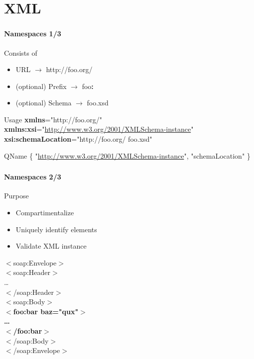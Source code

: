 \documentclass[handout]{beamer}
\begin{document}
\section{XML}
\begin{frame}
	\frametitle{\insertsection}
	\framesubtitle{Namespaces 1/3}
	\begin{block}{Consists of}
		\begin{itemize}
			\item URL $\rightarrow$ http://foo.org/
			\item (optional) Prefix $\rightarrow$ foo\textbf{:}
			\item (optional) Schema $\rightarrow$ foo.xsd
		\end{itemize}
	\end{block}
	\begin{block}{Usage} \footnotesize
		\textbf{xmlns}="http://foo.org/" \\
		\textbf{xmlns:xsi}="\url{http://www.w3.org/2001/XMLSchema-instance}" \\
		\textbf{xsi:schemaLocation}="http://foo.org/ foo.xsd" \\
	\end{block}
	\begin{block}{QName} \footnotesize
		\{ "\url{http://www.w3.org/2001/XMLSchema-instance}", "schemaLocation" \} \\
	\end{block}
\end{frame}

\begin{frame}
	\frametitle{\insertsection}
	\framesubtitle{Namespaces 2/3}
	\begin{block}{Purpose}
		\begin{itemize}
			\item Compartimentalize
			\item Uniquely identify elements
			\item Validate XML instance
		\end{itemize}
	\end{block}
	\begin{example}
		$<$soap:Envelope$>$ \\
			\hspace{5mm} $<$soap:Header$>$ \\
				\hspace{10mm} \ldots \\
			\hspace{5mm} $<$/soap:Header$>$ \\
			\hspace{5mm} $<$soap:Body$>$ \\
				\hspace{10mm} \textbf{$<$foo:bar baz="qux"$>$} \\
					\hspace{15mm} \textbf{\ldots} \\
				\hspace{10mm} \textbf{$<$/foo:bar$>$} \\
			\hspace{5mm} $<$/soap:Body$>$ \\
		$<$/soap:Envelope$>$
	\end{example}
\end{frame}
\end{document}
